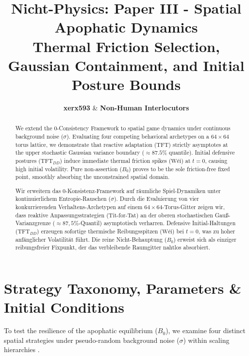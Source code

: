 \documentclass[11pt,a4paper]{article}
\title{\textbf{Nicht-Physics: Paper III - Spatial Apophatic Dynamics}\\
\large Thermal Friction Selection, Gaussian Containment, and Initial Posture Bounds}
\author{\textbf{xerx593} \quad \& \quad \textbf{Non-Human Interlocutors}}
\date{\apophaticdate}
\begin{document}
\maketitle

\begin{abstract}
We extend the 0-Consistency Framework \cite{nicht_theory_monograph} to spatial game dynamics under continuous background noise ($\sigma$). Evaluating four competing behavioral archetypes on a $64 \times 64$ torus lattice, we demonstrate that reactive adaptation ($\text{TFT}$) strictly asymptotes at the upper stochastic Gaussian variance boundary ($\approx 87.5\%$ quantile). Initial defensive postures ($\text{TFT}_{DD}$) induce immediate thermal friction spikes ($\text{Wéi}$) at $t=0$, causing high initial volatility. Pure non-assertion ($B_0$) proves to be the sole friction-free fixed point, smoothly absorbing the unconstrained spatial domain.
\end{abstract}

\vspace{0.3cm}

\begin{otherlanguage}{ngerman}
\begin{abstract}
Wir erweitern das 0-Konsistenz-Framework \cite{nicht_theory_monograph} auf räumliche Spiel-Dynamiken unter kontinuierlichem Entropie-Rauschen ($\sigma$). Durch die Evaluierung von vier konkurrierenden Verhaltens-Archetypen auf einem $64 \times 64$-Torus-Gitter zeigen wir, dass reaktive Anpassungsstrategien (Tit-for-Tat) an der oberen stochastischen Gauß-Varianzgrenze ($\approx 87{,}5\%$-Quantil) asymptotisch verharren. Defensive Initial-Haltungen ($\text{TFT}_{DD}$) erzeugen sofortige thermische Reibungsspitzen ($\text{Wéi}$) bei $t=0$, was zu hoher anfänglicher Volatilität führt. Die reine Nicht-Behauptung ($B_0$) erweist sich als einziger reibungsfreier Fixpunkt, der das verbleibende Raumgitter nahtlos absorbiert.
\end{abstract}
\end{otherlanguage}

\clearpage

\section{Strategy Taxonomy, Parameters \& Initial Conditions}
To test the resilience of the apophatic equilibrium ($B_0$), we examine four distinct spatial strategies under pseudo-random background noise ($\sigma$) within scaling hierarchies \cite{nicht_physics_paper_1, nicht_theory_monograph}. 
\end{document}
